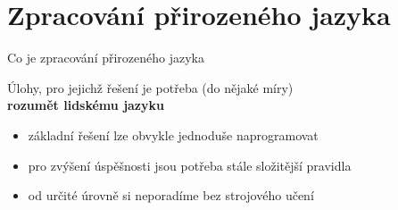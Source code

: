 \section[Zpracování jazyka]{Zpracování přirozeného jazyka}

\begin{frame}{Co je zpracování přirozeného jazyka}

    \begin{center}

        \Large Úlohy, pro jejichž řešení je potřeba (do nějaké míry) \\ \textbf{rozumět
        lidskému jazyku}

    \end{center}

    \begin{itemize}[<+->]

        \item<2-> základní řešení lze obvykle jednoduše naprogramovat

        \item<3-> pro zvýšení úspěšnosti jsou potřeba stále složitější pravidla

        \item<4-> od určité úrovně si neporadíme bez strojového učení

    \end{itemize}

\end{frame}


